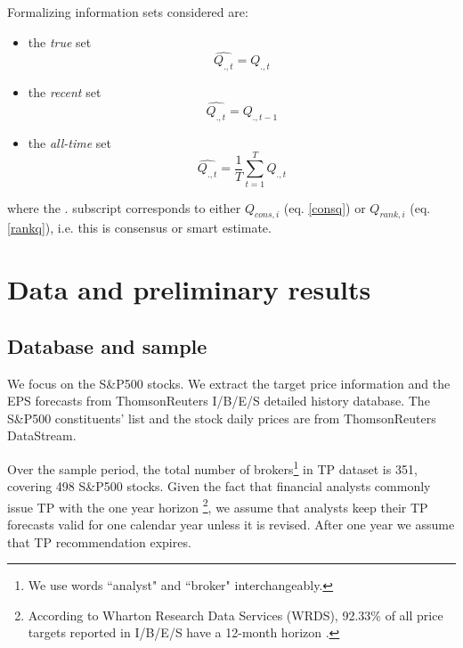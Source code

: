 \documentclass{article}\usepackage[]{graphicx}\usepackage[]{color}
\newcommand{\tr}{\textit{true}}
\newcommand{\naive}{\textit{recent}}
\newcommand{\default}{\textit{all-time}}
\begin{document}
Formalizing information sets considered are: 
\begin{itemize}
\item  the \tr{} set%
\begin{equation}
\label{q:true}
\widehat{Q_{.,t}}=Q_{.,t}
\end{equation}

\item  the \naive{} set %
\begin{equation}
\label{q:naive}
\widehat{Q_{.,t}}=Q_{.,t-1}
\end{equation}

\item  the \default{}  set%
\begin{equation}
\label{q:default}
\widehat{Q_{.,t}} = \frac{1}{T} \sum_{t=1}^{T} Q_{.,t}
\end{equation}
\end{itemize}
where the $.$ subscript corresponds to either $Q_{cons,i}$ (eq. \ref{consq}) or $Q_{rank,i}$ (eq. \ref{rankq}), i.e. this is consensus or smart estimate.




\section{Data and preliminary results}
\label{sec:rankings}

\subsection{Database and sample}
We focus on the  S\&P500 stocks. We extract the target price information and the EPS forecasts from ThomsonReuters  I/B/E/S detailed history database. The  S\&P500 constituents' list and the stock daily prices are from ThomsonReuters DataStream.


Over the sample period, the total number of brokers\footnote{We use words ``analyst" and ``broker" interchangeably.} in TP dataset is 351, covering 498 S\&P500 stocks. Given the fact that financial analysts commonly issue TP with the one year horizon \footnote{According to Wharton Research Data Services (WRDS), 92.33\% of all price targets reported in I/B/E/S have a 12-month horizon \citep{glushkov2009}.}, we assume that analysts keep their TP forecasts valid for one calendar year unless it is revised. After one year we assume that TP recommendation expires.
\end{document}
